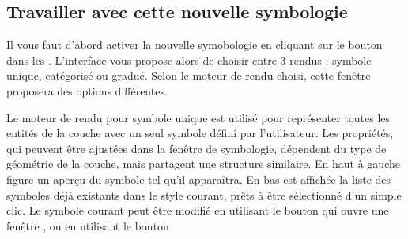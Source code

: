 \subsection{Travailler avec cette nouvelle symbologie}

Il vous faut d'abord activer la nouvelle symobologie en cliquant sur le bouton  dans les . L'interface vous propose alors de choisir entre 3 rendus : symbole unique, catégorisé ou gradué. Selon le moteur de rendu choisi, cette fenêtre proposera des options différentes.


Le moteur de rendu pour symbole unique est utilisé pour représenter toutes les entités de la couche avec un seul symbole défini par l'utilisateur. Les propriétés, qui peuvent être ajustées dans la fenêtre de symbologie, dépendent du type de géométrie de la couche, mais partagent une structure similaire. En haut à gauche figure un aperçu du symbole tel qu'il apparaîtra. En bas est affichée la liste des symboles déjà existants dans le style courant, prêts à être sélectionné d'un simple clic. Le symbole courant peut être modifié en utilisant le bouton  qui ouvre une fenêtre , ou en utilisant le bouton \button{}

